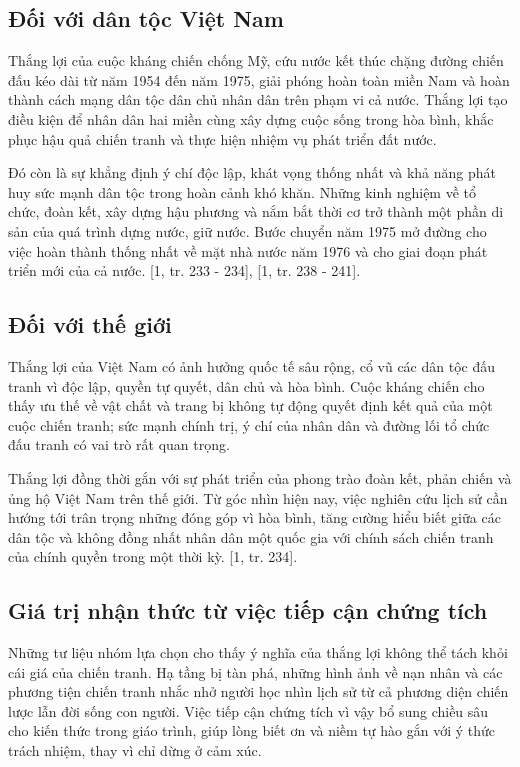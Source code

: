 \subsection{Đối với dân tộc Việt Nam}

Thắng lợi của cuộc kháng chiến chống Mỹ, cứu nước kết thúc chặng đường chiến đấu kéo dài từ năm 1954 đến năm 1975, giải phóng hoàn toàn miền Nam và hoàn thành cách mạng dân tộc dân chủ nhân dân trên phạm vi cả nước. Thắng lợi tạo điều kiện để nhân dân hai miền cùng xây dựng cuộc sống trong hòa bình, khắc phục hậu quả chiến tranh và thực hiện nhiệm vụ phát triển đất nước.

Đó còn là sự khẳng định ý chí độc lập, khát vọng thống nhất và khả năng phát huy sức mạnh dân tộc trong hoàn cảnh khó khăn. Những kinh nghiệm về tổ chức, đoàn kết, xây dựng hậu phương và nắm bắt thời cơ trở thành một phần di sản của quá trình dựng nước, giữ nước. Bước chuyển năm 1975 mở đường cho việc hoàn thành thống nhất về mặt nhà nước năm 1976 và cho giai đoạn phát triển mới của cả nước. [1, tr. 233 - 234], [1, tr. 238 - 241].

\subsection{Đối với thế giới}

Thắng lợi của Việt Nam có ảnh hưởng quốc tế sâu rộng, cổ vũ các dân tộc đấu tranh vì độc lập, quyền tự quyết, dân chủ và hòa bình. Cuộc kháng chiến cho thấy ưu thế về vật chất và trang bị không tự động quyết định kết quả của một cuộc chiến tranh; sức mạnh chính trị, ý chí của nhân dân và đường lối tổ chức đấu tranh có vai trò rất quan trọng.

Thắng lợi đồng thời gắn với sự phát triển của phong trào đoàn kết, phản chiến và ủng hộ Việt Nam trên thế giới. Từ góc nhìn hiện nay, việc nghiên cứu lịch sử cần hướng tới trân trọng những đóng góp vì hòa bình, tăng cường hiểu biết giữa các dân tộc và không đồng nhất nhân dân một quốc gia với chính sách chiến tranh của chính quyền trong một thời kỳ. [1, tr. 234].

\subsection{Giá trị nhận thức từ việc tiếp cận chứng tích}

Những tư liệu nhóm lựa chọn cho thấy ý nghĩa của thắng lợi không thể tách khỏi cái giá của chiến tranh. Hạ tầng bị tàn phá, những hình ảnh về nạn nhân và các phương tiện chiến tranh nhắc nhở người học nhìn lịch sử từ cả phương diện chiến lược lẫn đời sống con người. Việc tiếp cận chứng tích vì vậy bổ sung chiều sâu cho kiến thức trong giáo trình, giúp lòng biết ơn và niềm tự hào gắn với ý thức trách nhiệm, thay vì chỉ dừng ở cảm xúc.

